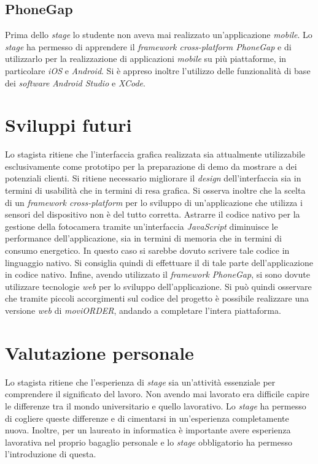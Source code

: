 \subsection{PhoneGap}

Prima dello \textit{stage} lo studente non aveva mai realizzato un'applicazione \textit{mobile}. Lo \textit{stage} ha permesso di apprendere il \textit{framework cross-platform PhoneGap} e di utilizzarlo per la realizzazione di applicazioni \textit{mobile} su più piattaforme, in particolare \textit{iOS} e \textit{Android}. Si è appreso inoltre l'utilizzo delle funzionalità di base dei \textit{software} \textit{Android Studio} e \textit{XCode}.

\section{Sviluppi futuri}

Lo stagista ritiene che l'interfaccia grafica realizzata sia attualmente utilizzabile esclusivamente come prototipo per la preparazione di demo da mostrare a dei potenziali clienti. Si ritiene necessario migliorare il \textit{design} dell'interfaccia sia in termini di usabilità che in termini di resa grafica. 
Si osserva inoltre che la scelta di un \textit{framework cross-platform} per lo sviluppo di un'applicazione che utilizza i sensori del dispositivo non è del tutto corretta. Astrarre il codice nativo per la gestione della fotocamera tramite un'interfaccia \textit{JavaScript} diminuisce le performance dell'applicazione, sia in termini di memoria che in termini di consumo energetico. In questo caso si sarebbe dovuto scrivere tale codice in linguaggio nativo. Si consiglia quindi di effettuare il  di tale parte dell'applicazione in codice nativo.
Infine, avendo utilizzato il \textit{framework PhoneGap}, si sono dovute utilizzare tecnologie \textit{web} per lo sviluppo dell'applicazione. Si può quindi osservare che tramite piccoli accorgimenti sul codice del progetto è possibile realizzare una versione \textit{web} di \textit{moviORDER}, andando a completare l'intera piattaforma.

\section{Valutazione personale}

Lo stagista ritiene che l'esperienza di \textit{stage} sia un'attività essenziale per comprendere il significato del lavoro. Non avendo mai lavorato era difficile capire le differenze tra il mondo universitario e quello lavorativo. Lo \textit{stage} ha permesso di cogliere queste differenze e di cimentarsi in un'esperienza completamente nuova. Inoltre, per un laureato in informatica è importante avere esperienza lavorativa nel proprio bagaglio personale e lo \textit{stage} obbligatorio ha permesso l'introduzione di questa.

